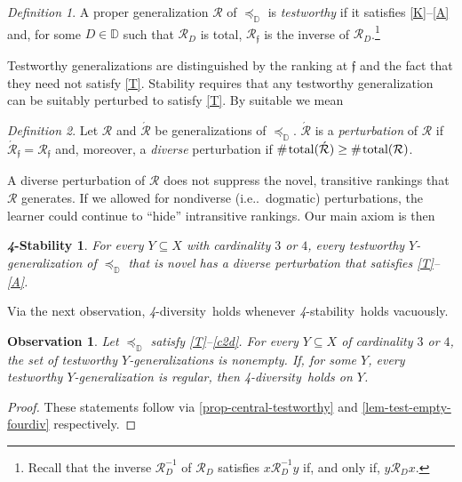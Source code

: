 \documentclass[ecta,nameyear,draft]{econsocart}
\makeatletter
\newcommand{\countof}{\mathbin{\#}\hskip1pt}
\newcommand{\mc}{\mathcal}
\newcommand{\novel}{\mathfrak f}
\newcommand{\preceqb}{\mathbin{\preceq}}
\newcommand{\ext}{\mathrel{\mc R}}
\newcommand{\extb}{\mathbin{\mc R}}
\newcommand{\hextb}{\mathbin{\hat{\mathbin{\mathcal R}}}}
\newcommand{\aext}{\mathrel{\acute{\mathrel{\mathcal R}}}}
\newcommand{\aextb}{\mathbin{\acute{\mathbin{\mathcal R}}}}
\newcommand{\total}{\textup{total}}
\newcommand{\mbbd}{{\mathds D}}
\newcommand{\stability}{\textit{4}-\textup{{stability}}}
\newcommand{\fourdiv}{\textit{4}-\textup{diversity}}
\newcommand\ie{i\@.e\@ifnextchar.{}{.\@}}
\theoremstyle{plain}
\newtheorem{observation}{Observation}
\newtheorem*{stability*}{\textit{4}-Stability}
\theoremstyle{remark}
\newtheorem*{definition*}{Definition}
\makeatother
\begin{document}
\begin{definition*}\label{def-testworthy}
  A proper {generalization} $\ext$ of $\preceqb_{\mbbd}$ is \emph{testworthy}
  if it satisfies \textup{\ref{K}--\ref{A}} and, for some $D\in \mbbd$ such
  that $\ext_{D}$ is total, $\extb _{\novel}$ is the inverse of
  $\extb_{D}$.\footnote{Recall that the inverse $\ext _{D}^{- 1}$ of $\ext
  _{D}$ satisfies $x \ext _{D}^{- 1} y$ if, and only if, $y \ext _{D}
  x$.}
\end{definition*}
Testworthy {generalization}s are distinguished by the ranking at $\novel$ and
the fact that they need not satisfy \ref{T}.  Stability requires that any
testworthy {generalization} can be suitably perturbed to satisfy \ref{T}. By
suitable we mean
\begin{definition*} Let $\ext$ and $\aext$ be {generalization}s of
  $\preceqb_{\mbbd}$. $\aext$ is a \emph{perturbation} of $\ext$ if
  $\aextb_{\novel} = \extb_{\novel}$ and, moreover, a \emph{{{diverse}}}
  perturbation if $\countof \total (\aextb) \geq \countof \total ( \extb)$.
\end{definition*}
A diverse perturbation of $\ext$ does not suppress the novel, transitive
rankings that $\ext$ generates. If we allowed for nondiverse (\ie\ dogmatic)
perturbations, the learner could continue to ``hide'' intransitive rankings.
Our main axiom is then
\begin{stability*}\label{P}
  For every $Y\subseteq X$ with cardinality $3$ or $4$, every testworthy
  $Y$-{generalization} of $\preceqb _{\mbbd}$ that is novel has a {{diverse}}
  perturbation that satisfies \ref{T}–\ref{A}.
\end{stability*}
Via the next observation, \fourdiv\ holds whenever \stability\ holds vacuously.
\begin{observation} \label{obs-testworthy}
  Let $\preceq_{\mbbd}$ satisfy \ref{T}–\ref{c2d}. For
  every $Y\subseteq X$ of cardinality $3$ or $4$, the set of testworthy
  $Y$-{generalization}s is nonempty. If, for some $Y$, every testworthy
  $Y$-{generalization} is regular, then \fourdiv\ holds on $Y$.
\end{observation}
\begin{proof}\label{proof-obs-testworthy}
  These statements follow via \cref{prop-central-testworthy}
  and \cref{lem-test-empty-fourdiv} respectively.
\end{proof}
\end{document}
